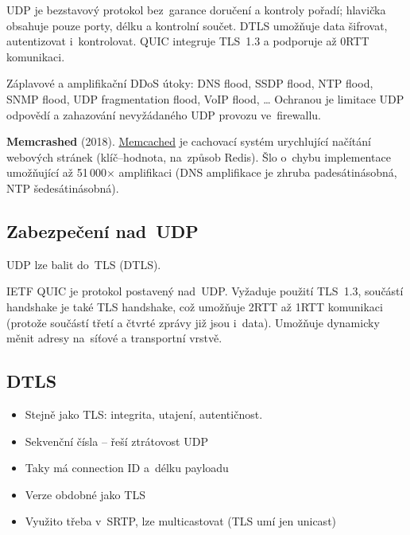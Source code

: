 UDP je bezstavový protokol bez~garance doručení a kontroly pořadí; hlavička obsahuje pouze porty, délku a kontrolní součet.
DTLS umožňuje data šifrovat, autentizovat i~kontrolovat.
QUIC integruje TLS~1.3 a podporuje až 0RTT komunikaci.

Záplavové a amplifikační DDoS útoky:
DNS flood, SSDP flood, NTP flood, SNMP flood, UDP fragmentation flood, VoIP flood, \dots
Ochranou je limitace UDP odpovědí a zahazování nevyžádaného UDP provozu ve~firewallu.

\textbf{Memcrashed} (2018).
\href{https://memcached.org}{Memcached} je cachovací systém urychlující načítání webových stránek (klíč--hodnota, na~způsob Redis).
Šlo o~chybu implementace umožňující až 51\,000$\times$ amplifikaci (DNS amplifikace je zhruba padesátinásobná, NTP šedesátinásobná).


\subsection{Zabezpečení nad~UDP}

UDP lze balit do~TLS (DTLS).

IETF QUIC je protokol postavený nad~UDP.
Vyžaduje použití TLS~1.3, součástí handshake je také TLS handshake, což umožňuje 2RTT až 1RTT komunikaci (protože součástí třetí a čtvrté zprávy již jsou i~data).
Umožňuje dynamicky měnit adresy na~síťové a transportní vrstvě.

\subsection{DTLS}
\begin{itemize}
    \item Stejně jako TLS: integrita, utajení, autentičnost.
    \item Sekvenční čísla -- řeší ztrátovost UDP
    \item Taky má connection ID a~délku payloadu
    \item Verze obdobné jako TLS
    \item Využito třeba v~SRTP, lze multicastovat (TLS umí jen unicast)
\end{itemize}

